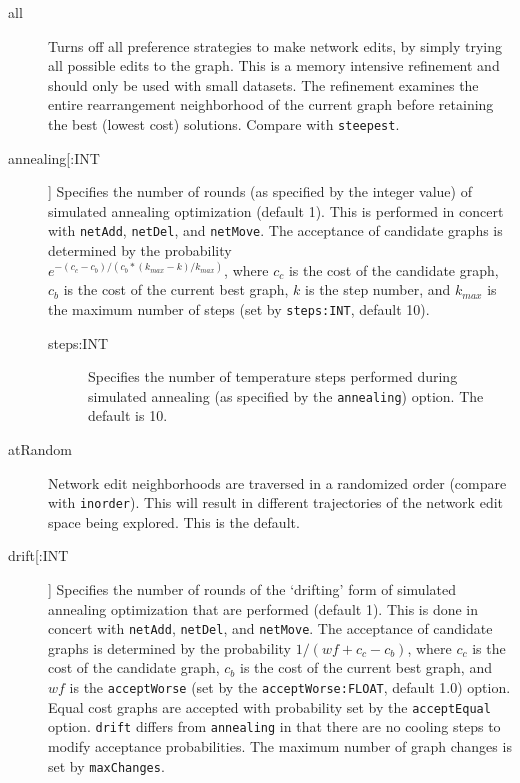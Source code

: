 	\begin{description}
		
		
		\item[all] Turns off all preference strategies to make network edits, by simply trying 
		all possible edits to the graph. This is a memory intensive refinement and should only
		be used with small datasets. The refinement examines the entire rearrangement 
		neighborhood of the current graph before retaining the best (lowest cost) solutions. 
		Compare with \texttt{steepest}.
			
		\item[annealing[:INT]] Specifies the number of rounds (as specified by the integer 
		value) of simulated annealing optimization \citep{Metropolisetal1953, 
		Kirkpatricketal1983, Cerny1985} (default 1). This is performed in concert with 
		\texttt{netAdd}, 	\texttt{netDel}, and \texttt{netMove}. The acceptance of candidate 
		graphs is determined by the probability\\ $e ^ {- (c_c - c_b)/ (c_b * (k_{max} -k)/ 
		k_{max})}$, where $c_c$ is the cost of the candidate graph, $c_b$ is the cost of 
		the current best graph, $k$ is the step number, and $k_{max}$ is the maximum 
		number of steps (set by \texttt{steps:INT}, default 10).

		\begin{description}
			\item[steps:INT] Specifies the number of temperature steps performed 
			during simulated annealing (as specified by the \texttt{annealing}) option.
			The default is 10.
		\end{description}
		
		\item[atRandom] Network edit neighborhoods are traversed in a randomized order 
		(compare with \texttt{inorder}). This will result in different trajectories of the network 
		edit space being explored. This is the default.

		\item[drift[:INT]] Specifies the number of rounds of the `drifting' form of simulated 
		annealing optimization \citep{goloboff1999} that are performed (default 1). This is 
		done in concert with \texttt{netAdd}, \texttt{netDel}, and \texttt{netMove}. The 
		acceptance of candidate graphs is determined by the probability $1/ (wf + c_c - c_b)$, 
		where $c_c$ is the cost of the candidate graph, $c_b$ is the cost of the current 
		best graph, and $wf$ is the \texttt{acceptWorse} (set by the \texttt{acceptWorse:FLOAT}, 
		default 1.0) option. Equal cost graphs are accepted with probability set by the 
		\texttt{acceptEqual} option. \texttt{drift} differs from \texttt{annealing} in that there are 
		no cooling steps to modify acceptance probabilities. The maximum number of graph 
		changes is set by \texttt{maxChanges}.
		

\end{description}
